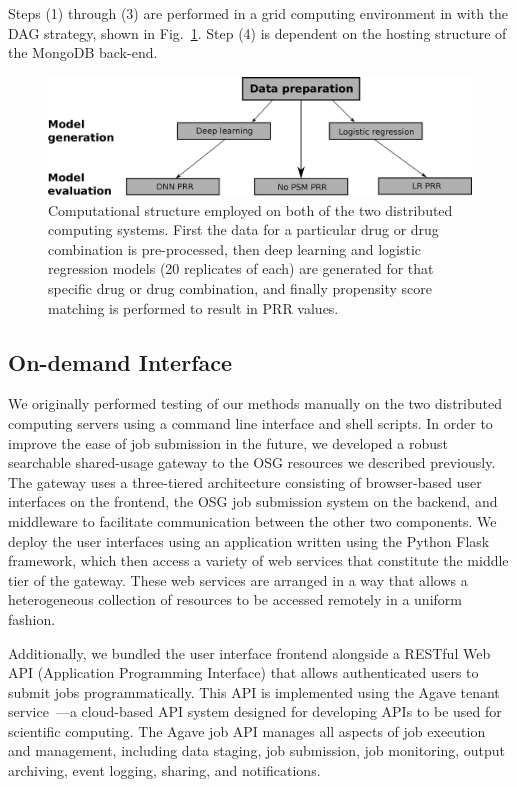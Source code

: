 \documentclass{ws-procs11x85}
\begin{document}
Steps (1) through (3) are performed in a grid computing environment in
with the DAG strategy, shown in Fig.~\ref{fig:dag}.  Step (4) is
dependent on the hosting structure of the MongoDB back-end.

\begin{figure}[h]
\centerline{\includegraphics[width=\textwidth]{dag}}
\caption{Computational structure employed on both of the two distributed computing
  systems. First the data for a particular drug or drug combination is
  pre-processed, then deep learning and logistic regression models (20 replicates of each)
  are generated for that specific drug or drug combination, and finally
  propensity score matching is performed to result in PRR values.}
\label{fig:dag}
\end{figure}


\subsection{On-demand Interface}\label{sec:on-demand}
We originally performed testing of our methods manually on the two
distributed computing servers using a command line interface and shell
scripts. In order to improve the ease of job submission in the future,
we developed a robust searchable shared-usage gateway to the OSG
resources we described previously. The gateway uses a
three-tiered architecture consisting of browser-based user interfaces
on the frontend, the OSG job submission system on the backend, and
middleware to facilitate communication between the other two
components. We deploy the user interfaces using an application written
using the Python Flask framework, which then access a variety of web
services that constitute the middle tier of the gateway. These web
services are arranged in a way that allows a heterogeneous collection
of resources to be accessed remotely in a uniform fashion.

Additionally, we bundled the user interface frontend alongside a
RESTful Web API (Application Programming Interface) that allows
authenticated users to submit jobs programmatically. This API is
implemented using the Agave tenant service~\cite{dooley2012agave}---a
cloud-based API system designed for developing APIs to be used for
scientific computing. The Agave job API manages all aspects of job
execution and management, including data staging, job submission, job
monitoring, output archiving, event logging, sharing, and
notifications.
\end{document}
